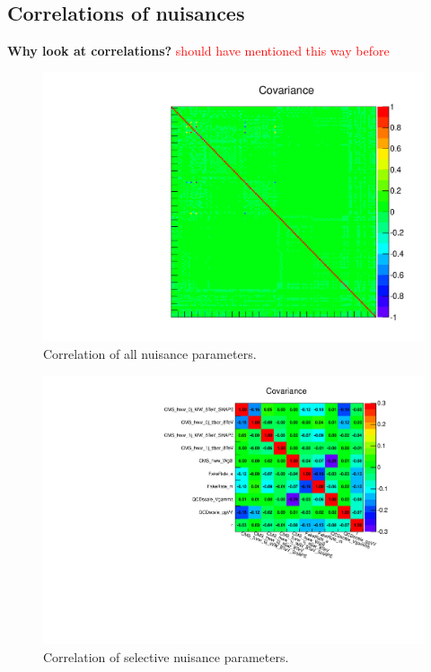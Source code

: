 \subsection{Correlations of nuisances}

\textbf{Why look at correlations?} 
\textcolor{red}{should have mentioned this way before} 

\begin{figure}[!hbtp]
\centering
\includegraphics[width=1.0\textwidth]{figures/covarianceAll.pdf}
\caption{Correlation of all nuisance parameters.}
\label{fig:covarianceAll}
\end{figure}

\begin{figure}[!hbtp]
\centering
\includegraphics[width=1.0\textwidth]{figures/covariance.pdf}
\caption{Correlation of selective nuisance parameters.}
\label{fig:covariance}
\end{figure}

